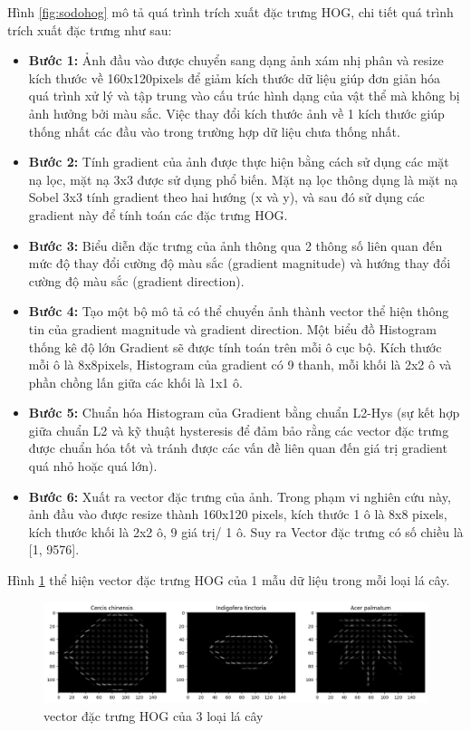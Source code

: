 \documentclass[a4paper]{article}
\begin{document}
Hình \ref{fig:sodohog} mô tả quá trình trích xuất đặc trưng HOG, chi tiết quá trình trích xuất đặc trưng như sau:
\begin{itemize}[label={}]
    \item \textbf{Bước 1: }Ảnh đầu vào được chuyển sang dạng ảnh xám nhị phân và resize kích thước về 160x120pixels để giảm kích thước dữ liệu giúp đơn giản hóa quá trình xử lý và tập trung vào cấu trúc hình dạng của vật thể mà không bị ảnh hưởng bởi màu sắc. Việc thay đổi kích thước ảnh về 1 kích thước giúp thống nhất các đầu vào trong trường hợp dữ liệu chưa thống nhất. 
    \item \textbf{Bước 2: }Tính gradient của ảnh được thực hiện bằng cách sử dụng các mặt nạ lọc, mặt nạ 3x3 được sử dụng phổ biến. Mặt nạ lọc thông dụng là mặt nạ Sobel 3x3 tính gradient theo hai hướng (x và y), và sau đó sử dụng các gradient này để tính toán các đặc trưng HOG. 
    \item \textbf{Bước 3: }Biểu diễn đặc trưng của ảnh thông qua 2 thông số liên quan đến mức độ thay đổi cường độ màu sắc (gradient magnitude) và hướng thay đổi cường độ màu sắc (gradient direction).
    \item \textbf{Bước 4: }Tạo một bộ mô tả có thể chuyển ảnh thành vector thể hiện thông tin của gradient magnitude và gradient direction. Một biểu đồ Histogram thống kê độ lớn Gradient sẽ được tính toán trên mỗi ô cục bộ. Kích thước mỗi ô là 8x8pixels, Histogram của gradient có 9 thanh, mỗi khối là 2x2 ô và phần chồng lấn giữa các khối là 1x1 ô. 
    \item \textbf{Bước 5: }Chuẩn hóa Histogram của Gradient bằng chuẩn L2-Hys (sự kết hợp giữa chuẩn L2 và kỹ thuật hysteresis để đảm bảo rằng các vector đặc trưng được chuẩn hóa tốt và tránh được các vấn đề liên quan đến giá trị gradient quá nhỏ hoặc quá lớn).
    \item \textbf{Bước 6: }Xuất ra vector đặc trưng của ảnh. Trong phạm vi nghiên cứu này, ảnh đầu vào được resize thành 160x120 pixels, kích thước 1 ô là 8x8 pixels, kích thước khối là 2x2 ô, 9 giá trị/ 1 ô. Suy ra Vector đặc trưng có số chiều là [1, 9576].
\end{itemize}
Hình \ref{fig:hogfeature} thể hiện vector đặc trưng HOG của 1 mẫu dữ liệu trong mỗi loại lá cây. 
\begin{figure}
    \centering
    \includegraphics[width=0.75\linewidth]{images/hogfeature.png}
    \caption{vector đặc trưng HOG của 3 loại lá cây}
    \label{fig:hogfeature}
\end{figure}
\newpage
\end{document}
